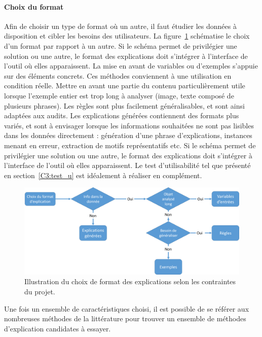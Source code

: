 \paragraph{Choix du format}

Afin de choisir un type de format où un autre, il faut étudier les données à disposition et cibler les besoins des utilisateurs. La figure~\ref{fig:guide_format} schématise le choix d'un format par rapport à un autre. Si le schéma permet de privilégier une solution ou une autre, le format des explications doit s'intégrer à l'interface de l'outil où elles apparaissent. La mise en avant de variables ou d'exemples s'appuie sur des éléments concrets. Ces méthodes conviennent à une utilisation en condition réelle.
Mettre en avant une partie du contenu particulièrement utile lorsque l'exemple entier est trop long à analyser (image, texte composé de plusieurs phrases).
Les règles sont plus facilement généralisables, et sont ainsi adaptées aux audits. Les explications générées contiennent des formats plus variés, et sont à envisager lorsque les informations souhaitées ne sont pas lisibles dans les données directement : génération d'une phrase d'explications, instances menant en erreur, extraction de motifs représentatifs etc.
Si le schéma permet de privilégier une solution ou une autre, le format des explications doit s'intégrer à l'interface de l'outil où elles apparaissent.
Le test d'utilisabilité tel que présenté en section~\ref{C3:test_u} est idéalement à réaliser en complément.

\begin{figure}[htpb!]
    \centering
    \includegraphics[scale=0.22]{S5-Presentation_du_template_nlp/figures/guide_format.png}
    \caption{Illustration du choix de format des explications selon les contraintes du projet.}
    \label{fig:guide_format}
\end{figure}

Une fois un ensemble de caractéristiques choisi, il est possible de se référer aux nombreuses méthodes de la littérature pour trouver un ensemble de méthodes d'explication candidates à  essayer.


